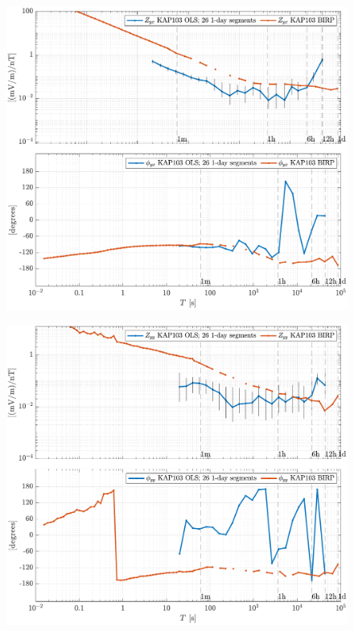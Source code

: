 \documentclass{article}
\begin{document}
\clearpage

\begin{figure}[h!]
\centering
\includegraphics[width=\textwidth]{figures/KAP103/transferfnZ_compare-Z_yx_Magnitude_Phase.pdf}
\caption{}
\label{fig:universe}
\end{figure}

\begin{figure}[h!]
\centering
\includegraphics[width=\textwidth]{figures/KAP103/transferfnZ_compare-Z_yy_Magnitude_Phase.pdf}
\caption{}
\label{fig:universe}
\end{figure}

\clearpage
\end{document}
